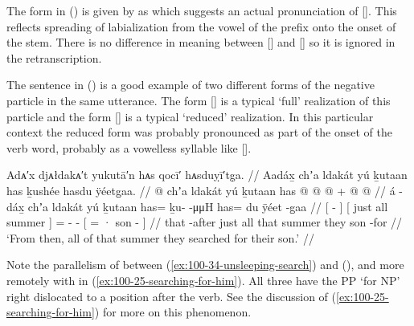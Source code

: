 The form  in (\lastx) is given by \citeauthor{swanton:1909} as  which suggests an actual pronunciation of [].
This reflects spreading of labialization from the vowel of the  prefix onto the onset of the stem.
There is no difference in meaning between [] and [] so it is ignored in the retranscription.

The sentence in (\lastx) is a good example of two different forms of the negative particle in the same utterance.
The form  [] is a typical ‘full’ realization of this particle and the form  [] is a typical ‘reduced’ realization.
In this particular context the reduced form was probably pronounced as part of the onset of the verb word, probably as a vowelless syllable like [].

\ex\label{ex:100-37-search-all-summer}%
%
\begingl
	\glpreamble	Adᴀ′x djᴀłdakᴀ′t yukutā′n hᴀs qocī′ hᴀsduỵī′tg̣a. //
	\glpreamble	Aadáx̱ chʼa ldakát yú ḵutaan has ḵushée hasdu ÿéetg̱aa. //
	\gla	{}  @ {} {} 
		{} chʼa ldakát yú ḵutaan {}
		has @  @ {} @ {} +
		{}  @ {}  @ {} {} //
	\glb	{} á -dáx̱ {}
		{} chʼa ldakát yú ḵutaan {}
		has= ḵu-  -μμH
		{} has= du ÿéet -g̱aa {} //
	\glc	{}[  - {}]
		{}[ just all  summer {}]
		= -  -
		{}[ = · son - {}] //
	\gld	{} that -after {}
		{} just all that summer {}
		they  {} {}
		{}  {} son -for {} //
	\glft	‘From then, all of that summer they searched for their son.’
		//
\endgl
\xe

Note the parallelism of  between (\ref{ex:100-34-unsleeping-search}) and (\lastx), and more remotely with  in (\ref{ex:100-25-searching-for-him}).
All three have the PP  ‘for NP’ right dislocated to a position after the verb.
See the discussion of (\ref{ex:100-25-searching-for-him}) for more on this phenomenon.

